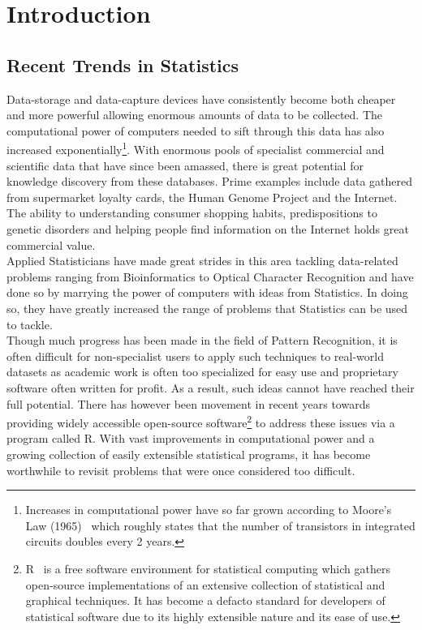 \chapter{Introduction}
\label{Introduction}

\section{Recent Trends in Statistics}
\label{RecentTrendsinStatistics}
Data-storage and data-capture devices have consistently become both cheaper and more powerful allowing enormous amounts of data to be collected. The computational power of computers needed to sift through this data has also increased exponentially\footnote{Increases in computational power have so far grown according to Moore's Law (1965)~\cite{Moore1965} which roughly states that the number of transistors in integrated circuits doubles every 2 years.}. With enormous pools of specialist commercial and scientific data that have since been amassed, there is great potential for knowledge discovery from these databases. Prime examples include data gathered from supermarket loyalty cards, the Human Genome Project and the Internet. The ability to understanding consumer shopping habits, predispositions to genetic disorders and helping people find information on the Internet holds great commercial value.\\

Applied Statisticians have made great strides in this area tackling data-related problems ranging from Bioinformatics to Optical Character Recognition and have done so by marrying the power of computers with ideas from Statistics. In doing so, they have greatly increased the range of problems that Statistics can be used to tackle. \\

Though much progress has been made in the field of Pattern Recognition, it is often difficult for non-specialist users to apply such techniques to real-world datasets as academic work is often too specialized for easy use and proprietary software often written for profit. As a result, such ideas cannot have reached their full potential. There has however been movement in recent years towards providing widely accessible open-source software\footnote{R~\cite{R} is a free software environment for statistical computing which gathers open-source implementations of an extensive collection of statistical and graphical techniques. It has become a defacto standard for developers of statistical software due to its highly extensible nature and its ease of use.} to address these issues via a program called R. With vast improvements in computational power and a growing collection of easily extensible statistical programs, it has become worthwhile to revisit problems that were once considered too difficult. 

